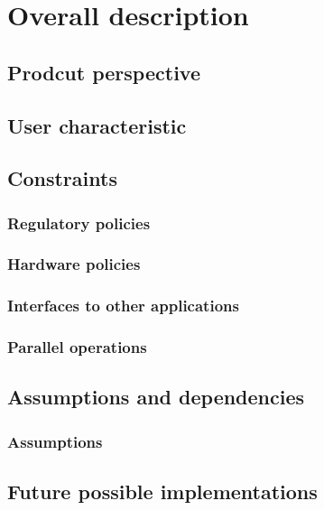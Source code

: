 \chapter{Overall description}

\section{Prodcut perspective}

\section{User characteristic}

\section{Constraints}

\subsection{Regulatory policies}

\subsection{Hardware policies}

\subsection{Interfaces to other applications}

\subsection{Parallel operations}

\section{Assumptions and dependencies}

\subsection{Assumptions}

\subsection{}

\section{Future possible implementations}
